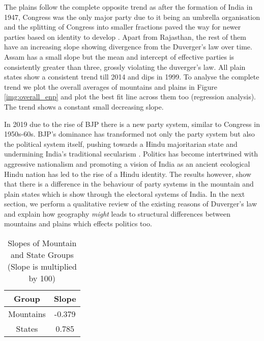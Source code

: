 \vspace{0.3cm}

The plains follow the complete opposite trend as after the formation of India in 1947, Congress was the only major party due to it being an umbrella organisation and the splitting of Congress into smaller fractions paved the way for newer parties based on identity to develop \citep{kothari1967india}. Apart from Rajasthan, the rest of them have an increasing slope showing divergence from the Duverger’s law over time. Assam has a small slope but the mean and intercept of effective parties is consistently greater than three, grossly violating the duverger’s law. All plain states show a consistent trend till 2014 and dips in 1999. To analyse the complete trend we plot the overall averages of mountains and plains in Figure \ref{img:overall_enp} and plot the best fit line across them too (regression analysis). The trend shows a constant small decreasing slope.

\vspace{0.3cm}
In 2019 due to the rise of BJP there is a new party system, similar to Congress in 1950s-60s. BJP's dominance has transformed not only the party system but also the political system itself, pushing towards a Hindu majoritarian state and undermining India's traditional secularism \citep{jaffrelot2020bjp}.  Politics has become intertwined with aggressive nationalism and promoting a vision of India as an ancient ecological Hindu nation has led to the rise of a Hindu identity. The results however, show that there is a difference in the behaviour of party systems in the mountain and plain states which is show through the electoral systems of India. In the next section, we perform a qualitative review of the existing reasons of Duverger's law and explain how geography \textit{might} leads to structural differences between mountains and plains which effects politics too.


\begin{table}[h]
\centering
\begin{tabular}{|c|c|}
\hline
Group & Slope \\
\hline
Mountains & -0.379 \\
\hline
States & 0.785 \\
\hline
\end{tabular}
\caption{Slopes of Mountain and State Groups (Slope is multiplied by 100)}

\end{table}


